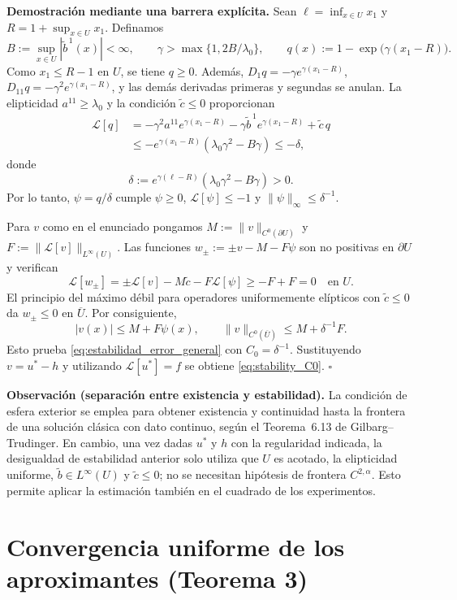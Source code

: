 \medskip
\noindent\textbf{Demostración mediante una barrera explícita.}
Sean $\ell=\inf_{x\in U}x_1$ y $R=1+\sup_{x\in U}x_1$.
Definamos
\[
B:=\sup_{x\in U}|\widetilde b^{\,1}(x)|<\infty,
\qquad
\gamma>\max\{1,2B/\lambda_0\},
\qquad
q(x):=1-\exp\bigl(\gamma(x_1-R)\bigr).
\]
Como $x_1\le R-1$ en $U$, se tiene $q\ge0$. Además,
$D_1q=-\gamma e^{\gamma(x_1-R)}$,
$D_{11}q=-\gamma^2 e^{\gamma(x_1-R)}$, y las demás derivadas
primeras y segundas se anulan. La elipticidad $a^{11}\ge\lambda_0$
y la condición $\widetilde c\le0$ proporcionan
\[
\begin{aligned}
\mathcal L[q]
&=-\gamma^2a^{11}e^{\gamma(x_1-R)}
-\gamma\widetilde b^{\,1}e^{\gamma(x_1-R)}
+\widetilde c\,q\\
&\le-e^{\gamma(x_1-R)}(\lambda_0\gamma^2-B\gamma)
\le-\delta,
\end{aligned}
\]
donde
\[
\delta:=e^{\gamma(\ell-R)}(\lambda_0\gamma^2-B\gamma)>0.
\]
Por lo tanto, $\psi=q/\delta$ cumple $\psi\ge0$,
$\mathcal L[\psi]\le-1$ y $\|\psi\|_\infty\le\delta^{-1}$.

Para $v$ como en el enunciado pongamos
$M:=\|v\|_{C^0(\partial U)}$ y
$F:=\|\mathcal L[v]\|_{L^\infty(U)}$.
Las funciones $w_\pm:=\pm v-M-F\psi$ son no positivas en
$\partial U$ y verifican
\[
\mathcal L[w_\pm]
=\pm\mathcal L[v]-M\widetilde c-F\mathcal L[\psi]
\ge -F+F=0
\quad\text{en }U.
\]
El principio del máximo débil para operadores uniformemente elípticos
con $\widetilde c\le0$ da $w_\pm\le0$ en $\overline U$.
Por consiguiente,
\[
|v(x)|\le M+F\psi(x),\qquad
\|v\|_{C^0(\overline U)}\le M+\delta^{-1}F.
\]
Esto prueba \eqref{eq:estabilidad_error_general} con
$C_0=\delta^{-1}$. Sustituyendo $v=u^*-h$ y utilizando
$\mathcal L[u^*]=f$ se obtiene \eqref{eq:stability_C0}.
\hfill$\square$

\medskip
\noindent\textbf{Observación (separación entre existencia y estabilidad).}
La condición de esfera exterior se emplea para obtener existencia y
continuidad hasta la frontera de una solución clásica con dato continuo,
según el Teorema~6.13 de Gilbarg--Trudinger. En cambio, una vez dadas
$u^*$ y $h$ con la regularidad indicada, la desigualdad de estabilidad
anterior solo utiliza que $U$ es acotado, la elipticidad uniforme,
$\widetilde b\in L^\infty(U)$ y $\widetilde c\le0$; no se necesitan
hipótesis de frontera $C^{2,\alpha}$. Esto permite aplicar la estimación
también en el cuadrado de los experimentos.

\section{Convergencia uniforme de los aproximantes (Teorema 3)}


